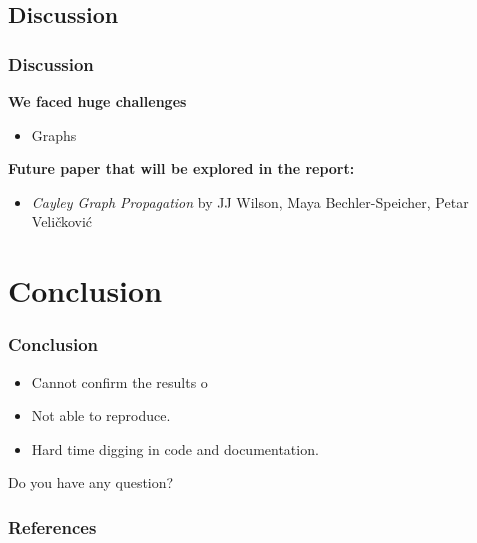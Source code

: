 \documentclass[10pt, aspectratio = 169]{beamer}
\begin{document}
\subsection{Discussion}
\begin{frame}
    \frametitle{Discussion}
    \textbf{We faced huge challenges}
    \begin{itemize}
        \item Graphs
    \end{itemize} 
    
    \textbf{Future paper that will be explored in the report:}
    \begin{itemize}
        \item \textit{Cayley Graph Propagation} by JJ Wilson, Maya 
        Bechler-Speicher, Petar Veličković \cite{wilson2024cayleygraphpropagation}
    \end{itemize}
\end{frame}

\section{Conclusion}
\begin{frame}
    \frametitle{Conclusion}
    \begin{itemize}
        \item Cannot confirm the results o
        \item Not able to reproduce.
        \item Hard time digging in code and documentation.
    \end{itemize}

    \begin{block}{Do you have any question?}
        
    \end{block}
\end{frame}

\begin{frame}[allowframebreaks]
    \frametitle{References}
    \scriptsize
    
    

\end{frame}
\end{document}
